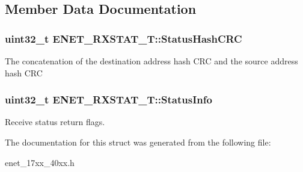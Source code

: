 \subsection{Member Data Documentation}
\hypertarget{struct_e_n_e_t___r_x_s_t_a_t___t_a52d71f70dc193d59f6cb67241d92a4c9}{
\subsubsection[{Status\+Hash\+C\+R\+C}]{\setlength{\rightskip}{0pt plus 5cm}uint32\+\_\+t E\+N\+E\+T\+\_\+\+R\+X\+S\+T\+A\+T\+\_\+\+T\+::\+Status\+Hash\+C\+R\+C}}\label{struct_e_n_e_t___r_x_s_t_a_t___t_a52d71f70dc193d59f6cb67241d92a4c9}
The concatenation of the destination address hash C\+R\+C and the source address hash C\+R\+C \hypertarget{struct_e_n_e_t___r_x_s_t_a_t___t_a0d2de29791ff4358c5cc4dedd694857d}{
\subsubsection[{Status\+Info}]{\setlength{\rightskip}{0pt plus 5cm}uint32\+\_\+t E\+N\+E\+T\+\_\+\+R\+X\+S\+T\+A\+T\+\_\+\+T\+::\+Status\+Info}}\label{struct_e_n_e_t___r_x_s_t_a_t___t_a0d2de29791ff4358c5cc4dedd694857d}
Receive status return flags. 

The documentation for this struct was generated from the following file\+:\begin{DoxyCompactItemize}
\item 
enet\+\_\+17xx\+\_\+40xx.\+h\end{DoxyCompactItemize}
